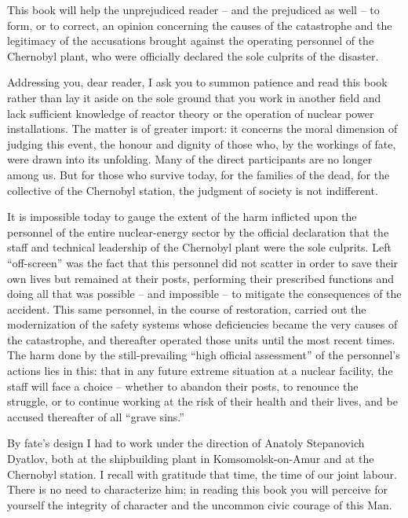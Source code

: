 \documentclass[openright]{bookest}
\begin{document}
This book will help the unprejudiced reader -- and the prejudiced as well -- to form, or to correct, an opinion concerning the causes of the catastrophe and the legitimacy of the accusations brought against the operating personnel of the Chernobyl plant, who were officially declared the sole culprits of the disaster.

Addressing you, dear reader, I ask you to summon patience and read this book rather than lay it aside on the sole ground that you work in another field and lack sufficient knowledge of reactor theory or the operation of nuclear power installations. The matter is of greater import: it concerns the moral dimension of judging this event, the honour and dignity of those who, by the workings of fate, were drawn into its unfolding. Many of the direct participants are no longer among us. But for those who survive today, for the families of the dead, for the collective of the Chernobyl station, the judgment of society is not indifferent.

It is impossible today to gauge the extent of the harm inflicted upon the personnel of the entire nuclear-energy sector by the official declaration that the staff and technical leadership of the Chernobyl plant were the sole culprits. Left ``off-screen'' was the fact that this personnel did not scatter in order to save their own lives but remained at their posts, performing their prescribed functions and doing all that was possible -- and impossible -- to mitigate the consequences of the accident. This same personnel, in the course of restoration, carried out the modernization of the safety systems whose deficiencies became the very causes of the catastrophe, and thereafter operated those units until the most recent times. The harm done by the still-prevailing ``high official assessment'' of the personnel's actions lies in this: that in any future extreme situation at a nuclear facility, the staff will face a choice -- whether to abandon their posts, to renounce the struggle, or to continue working at the risk of their health and their lives, and be accused thereafter of all ``grave sins.''

By fate's design I had to work under the direction of Anatoly Stepanovich Dyatlov, both at the shipbuilding plant in Komsomolsk-on-Amur and at the Chernobyl station. I recall with gratitude that time, the time of our joint labour. There is no need to characterize him; in reading this book you will perceive for yourself the integrity of character and the uncommon civic courage of this Man.
\end{document}
